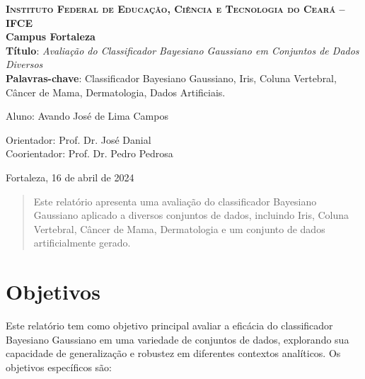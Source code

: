 \documentclass[12pt, a4paper]{report}
\begin{document}
\begin{titlepage}
  \centering
  \Large
  \textsc{\textbf{Instituto Federal de Educação, Ciência e Tecnologia do Ceará -- IFCE}}\\
  \textbf{Campus Fortaleza}\\[2.5cm]
  \LARGE
  \textbf{Título}: \textit{Avaliação do Classificador Bayesiano Gaussiano em Conjuntos de Dados Diversos}\\[1.5cm]
  \textbf{Palavras-chave}: Classificador Bayesiano Gaussiano, Iris, Coluna Vertebral, Câncer de Mama, Dermatologia, Dados Artificiais. \\[3cm]
  \Large
 
 \begin{minipage}[t][][t]{5cm}
 \end{minipage}
 \begin{minipage}[t][][t]{10cm}
	\begin{flushleft}
   Aluno: Avando José de Lima Campos
  \end{flushleft}
  \end{minipage}

\vspace{1cm}

  \begin{minipage}[t][][t]{5cm}
  \end{minipage}
  \begin{minipage}[t][][t]{14cm}
	\begin{flushleft}
   Orientador: Prof. Dr. José Danial\\ 
   Coorientador: Prof. Dr. Pedro Pedrosa
  \end{flushleft}
  \end{minipage}

  \vfill \large
  Fortaleza, 16 de abril de 2024
\end{titlepage}

\begin{abstract}
Este relatório apresenta uma avaliação do classificador Bayesiano Gaussiano aplicado a diversos conjuntos de dados, incluindo Iris, Coluna Vertebral, Câncer de Mama, Dermatologia e um conjunto de dados artificialmente gerado.
\end{abstract}

\tableofcontents
\listoffigures

\chapter{Objetivos}

Este relatório tem como objetivo principal avaliar a eficácia do classificador Bayesiano Gaussiano em uma variedade de conjuntos de dados, explorando sua capacidade de generalização e robustez em diferentes contextos analíticos. Os objetivos específicos são:
\end{document}
